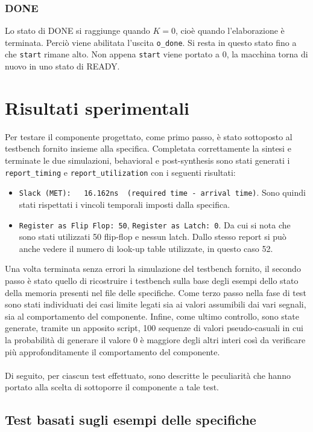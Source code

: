 \documentclass[10pt]{article}
\begin{document}
	\subsubsection{DONE}
	Lo stato di DONE si raggiunge quando $K = 0$, cioè quando l'elaborazione è terminata. Perciò viene abilitata l'uscita \lstinline[style=vhdl]|o_done|. Si resta in questo stato fino a che \lstinline[style=vhdl]|start| rimane alto. Non appena \lstinline[style=vhdl]|start| viene portato a 0, la macchina torna di nuovo in uno stato di READY.
	\section{Risultati sperimentali}
	Per testare il componente progettato, come primo passo, è stato sottoposto al testbench fornito insieme alla specifica. Completata correttamente la sintesi e terminate le due simulazioni, behavioral e post-synthesis sono stati generati i \lstinline|report_timing| e \lstinline|report_utilization| con i seguenti risultati:
	\begin{itemize}
		\item \lstinline|Slack (MET):	16.162ns  (required time - arrival time)|. Sono quindi stati rispettati i vincoli temporali imposti dalla specifica.
		\item \lstinline|Register as Flip Flop: 50|, \lstinline|Register as Latch: 0|. Da cui si nota che sono stati utilizzati 50 flip-flop e nessun latch. Dallo stesso report si può anche vedere il numero di look-up table utilizzate, in questo caso 52.
	\end{itemize}
	Una volta terminata senza errori la simulazione del testbench fornito, il secondo passo è stato quello di ricostruire i testbench sulla base degli esempi dello stato della memoria presenti nel file delle specifiche. Come terzo passo nella fase di test sono stati individuati dei casi limite legati sia ai valori assumibili dai vari segnali, sia al comportamento del componente. Infine, come ultimo controllo, sono state generate, tramite un apposito script, 100 sequenze di valori pseudo-casuali in cui la probabilità di generare il valore 0 è maggiore degli altri interi così da verificare più approfonditamente il comportamento del componente.
	\paragraph{}
	Di seguito, per ciascun test effettuato, sono descritte le peculiarità che hanno portato alla scelta di sottoporre il componente a tale test.
	\subsection{Test basati sugli esempi delle specifiche}
\end{document}
